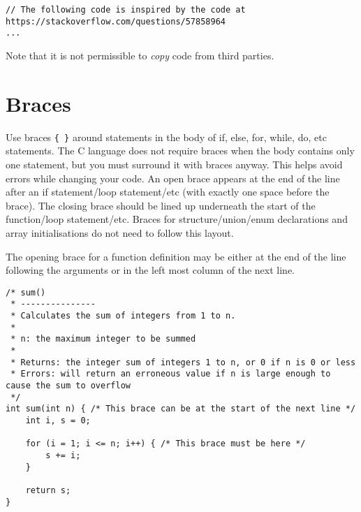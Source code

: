 \documentclass{article}
\begin{document}
\begin{lstlisting}
// The following code is inspired by the code at https://stackoverflow.com/questions/57858964
...
\end{lstlisting}

Note that it is not permissible to \textit{copy} code from third parties.

\section{Braces}
Use braces \texttt{\{ \}} around statements in the body of if, else, for, while, do, etc statements.
The C language does not require braces when the body contains only one statement, but you must 
surround it with braces anyway.
This helps avoid errors while changing your code.
An open brace appears at the end of the line after an if statement/loop statement/etc (with exactly 
one space before the brace).
The closing brace should be lined up underneath the start of the function/loop statement/etc.
Braces for structure/union/enum declarations and array initialisations do not need to follow this layout.

The opening brace for a function definition may be either at the end of the line following the 
arguments or in the left most column of the next line.

\begin{lstlisting}
/* sum()
 * ---------------
 * Calculates the sum of integers from 1 to n.
 *
 * n: the maximum integer to be summed
 *
 * Returns: the integer sum of integers 1 to n, or 0 if n is 0 or less
 * Errors: will return an erroneous value if n is large enough to cause the sum to overflow
 */
int sum(int n) { /* This brace can be at the start of the next line */
    int i, s = 0;

    for (i = 1; i <= n; i++) { /* This brace must be here */
        s += i;
    }

    return s;
}
\end{lstlisting}
\end{document}
